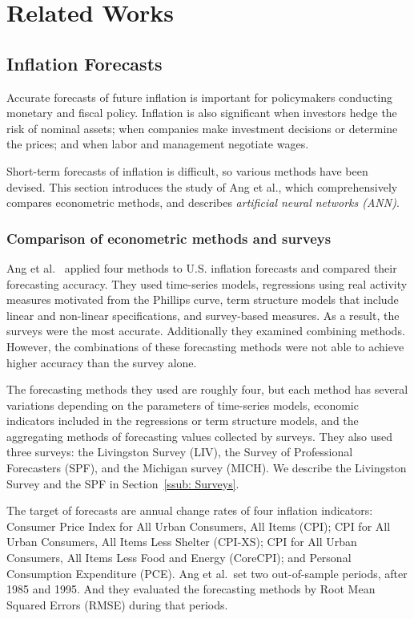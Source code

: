 \documentclass[../main.tex]{subfiles}
\begin{document}
\section{Related Works}
\label{sec: Related Works}

\subsection{Inflation Forecasts}
\label{sub: Inflation Forecasts}

Accurate forecasts of future inflation is important for policymakers conducting monetary and fiscal policy.
Inflation is also significant when investors hedge the risk of nominal assets; when companies make investment decisions or determine the prices; and when labor and management negotiate wages.

Short-term forecasts of inflation is difficult, so various methods have been devised.
This section introduces the study of Ang et al., which comprehensively compares econometric methods, and describes \emph{artificial neural networks (ANN)}.

\subsubsection{Comparison of econometric methods and surveys}

Ang et al.~\cite{Ang2007} applied four methods to U.S. inflation forecasts and compared their forecasting accuracy.  They used time-series models, regressions using real activity measures motivated from the Phillips curve, term structure models that include linear and non-linear specifications, and survey-based measures.
As a result, the surveys were the most accurate.
Additionally they examined combining methods.  However, the combinations of these forecasting methods were not able to achieve higher accuracy than the survey alone.

The forecasting methods they used are roughly four, but each method has several variations depending on the parameters of time-series models, economic indicators included in the regressions or term structure models, and the aggregating methods of forecasting values collected by surveys.
They also used three surveys: the Livingston Survey (LIV), the Survey of Professional Forecasters (SPF), and the Michigan survey (MICH).
We describe the Livingston Survey and the SPF in Section~\ref{ssub: Surveys}.

The target of forecasts are annual change rates of four inflation indicators: Consumer Price Index for All Urban Consumers, All Items (CPI); CPI for All Urban Consumers, All Items Less Shelter (CPI-XS); CPI for All Urban Consumers, All Items Less Food and Energy (CoreCPI); and Personal Consumption Expenditure (PCE).
Ang et al.\ set two out-of-sample periods, after 1985 and 1995.
And they evaluated the forecasting methods by Root Mean Squared Errors (RMSE) during that periods.
\end{document}
